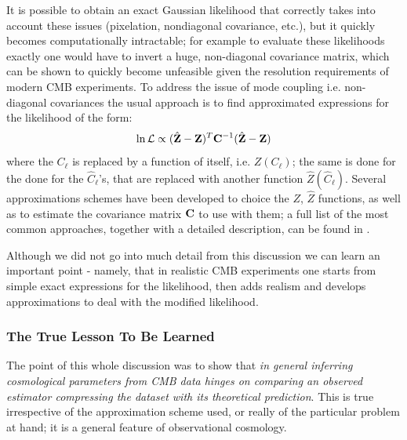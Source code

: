 It is possible to obtain an exact Gaussian likelihood that correctly takes into account these issues (pixelation, nondiagonal covariance, etc.), but it quickly becomes computationally intractable; for example to evaluate these likelihoods exactly one would have to invert a huge, non-diagonal covariance matrix, which can be shown to quickly become unfeasible given the resolution requirements of modern CMB experiments. \cite{likelihood_cmb}
To address the issue of mode coupling i.e. non-diagonal covariances the usual approach is to find approximated expressions for the likelihood of the form:
\begin{equation}
\label{eq:approx_cmb}
    \ln \mathcal{L} \propto (\hat{\vb{Z}}-\vb{Z})^T\vb{C}^{-1} (\hat{\vb{Z}}-\vb{Z})
\end{equation}
where the $C_\ell$ is replaced by a function of itself, i.e. $Z(C_\ell)$; the same is done for the done for the $\hat{C}_\ell$'s, that are replaced with another function $\hat{Z}(\hat{C}_\ell)$. Several approximations schemes have been developed to choice the $Z$, $\hat{Z}$ functions, as well as to estimate the covariance matrix $\vb{C}$ to use with them; a full list of the most common approaches, together with a detailed description, can be found in \cite{likelihood_cmb}.

Although we did not go into much detail from this discussion we can learn an important point - namely, that in realistic CMB experiments one starts from simple exact expressions for the likelihood, then adds realism and develops approximations to deal with the modified likelihood.

\subsubsection{The True Lesson To Be Learned}
The point of this whole discussion was to show that \emph{in general inferring cosmological parameters from CMB data hinges on comparing an observed estimator compressing the dataset with its theoretical prediction}. This is true irrespective of the approximation scheme used, or really of the particular problem at hand; it is a general feature of observational cosmology.

